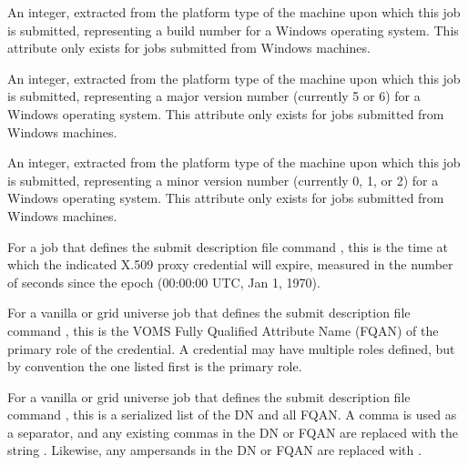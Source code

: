 \begin{description}
\item[\AdAttr{WindowsBuildNumber}:] An integer, extracted from the
platform type of the machine upon which this job is submitted,
representing a build number for a Windows operating system.
This attribute only exists for jobs submitted from Windows machines.

\item[\AdAttr{WindowsMajorVersion}:] An integer, extracted from the
platform type of the machine upon which this job is submitted,
representing a major version number (currently 5 or 6)
for a Windows operating system.
This attribute only exists for jobs submitted from Windows machines.

\item[\AdAttr{WindowsMinorVersion}:] An integer, extracted from the
platform type of the machine upon which this job is submitted, 
representing a minor version number (currently 0, 1, or 2)
for a Windows operating system.
This attribute only exists for jobs submitted from Windows machines.

\item[\AdAttr{X509UserProxyExpiration}:]   
For a job that defines the submit description file command
, this is the time at which the indicated
X.509 proxy credential will expire, measured in the
number of seconds since the epoch (00:00:00 UTC, Jan 1, 1970).

\item[\AdAttr{X509UserProxyFirstFQAN}:]   
For a vanilla or grid universe job that defines the submit description
file command , 
this is the VOMS Fully Qualified Attribute Name (FQAN) of
the primary role of the credential. 
A credential may have multiple roles defined, 
but by convention the one listed first is the primary role. 

\item[\AdAttr{X509UserProxyFQAN}:]   
For a vanilla or grid universe job that defines the submit description
file command , 
this is a serialized list of the DN and all FQAN.
A comma is used as a separator,
and any existing commas in the DN or FQAN are replaced with the string
.
Likewise, any ampersands in the DN or FQAN are replaced with
.


\end{description}
